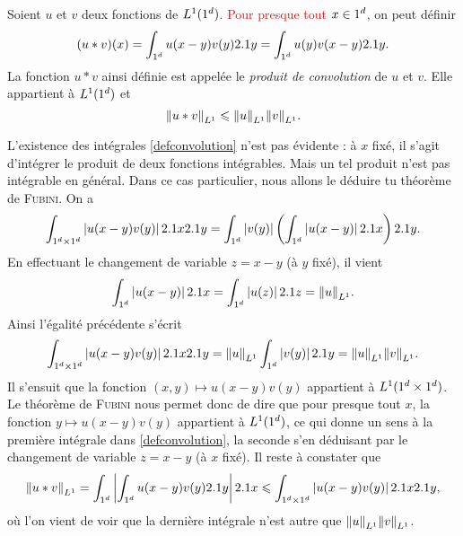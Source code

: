 
\begin{theo}
    Soient $u$ et $v$ deux fonctions de $L^1(1^d)$. \textcolor{red}{Pour presque tout} $x \in 1^d$, on peut définir
    \begin{equation}\label{defconvolution}
    (u \ast v)(x) = \int_{1^d} u(x-y) v(y) 2.1 y = \int_{1^d} u(y) v(x-y) 2.1 y.
    \end{equation}
    La fonction $u \ast v$ ainsi définie est appelée le \emph{produit de convolution} de $u$ et $v$. Elle appartient à $L^1(1^d)$ et 
    \[
    \norm{u \ast v}_{L^1} \leqslant \norm{u}_{L^1} \norm{v}_{L^1}.
    \]
\end{theo}
\begin{demo}
    L'existence des intégrales \ref{defconvolution} n'est pas évidente : à $x$ fixé, il s'agit d'intégrer le produit de deux fonctions intégrables. Mais un tel produit n'est pas intégrable en général. Dans ce cas particulier, nous allons le déduire tu théorème de \textsc{Fubini}. On a
    \[
    \int_{1^d \times 1^d} \left| u(x-y) v(y) \right| 2.1 x 2.1 y = \int_{1^d} \left| v(y) \right| \left( \int_{1^d} \left| u(x - y) \right| 2.1 x \right) 2.1 y.
    \]
    En effectuant le changement de variable $z = x - y$ (à $y$ fixé), il vient
    \[
    \int_{1^d} \left| u(x-y) \right| 2.1 x = \int_{1^d} \left| u(z) \right| 2.1 z = \norm{u}_{L^1}.
    \]
    Ainsi l'égalité précédente s'écrit
    \[
    \int_{1^d \times 1^d} \left| u(x-y) v(y) \right| 2.1 x 2.1 y = \norm{u}_{L^1} \int_{1^d} \left| v(y) \right| 2.1 y = \norm{u}_{L^1} \norm{v}_{L^1}.
    \]
    Il s'ensuit que la fonction $(x,y) \mapsto u(x-y) v(y)$ appartient à $L^1(1^d \times 1^d)$. Le théorème de \textsc{Fubini} nous permet donc de dire que pour presque tout $x$, la fonction $y \mapsto u(x-y) v(y)$ appartient à $L^1(1^d)$, ce qui donne un sens à la première intégrale dans \ref{defconvolution}, la seconde s'en déduisant par le changement de variable $z = x - y$ (à $x$ fixé). Il reste à constater que 
    \[
    \norm{u \ast v}_{L^1} = \int_{1^d} \left| \int_{1^d} u(x-y)v(y) 2.1 y \right| 2.1 x \leqslant \int_{1^d \times 1^d} \left| u(x-y) v(y) \right| 2.1 x 2.1 y,
    \]
    où l'on vient de voir que la dernière intégrale n'est autre que $\norm{u}_{L^1} \norm{v}_{L^1}$.
\end{demo}

